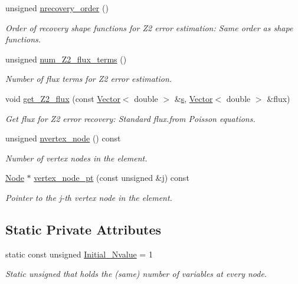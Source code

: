 \begin{DoxyCompactItemize}
unsigned \hyperlink{classoomph_1_1TPoissonElement_af9b5501d7aba59f31b9030e57d997af9}{nrecovery\+\_\+order} ()
\begin{DoxyCompactList}\small\item\em Order of recovery shape functions for Z2 error estimation\+: Same order as shape functions. \end{DoxyCompactList}\item 
unsigned \hyperlink{classoomph_1_1TPoissonElement_a73f3da4bd164baf56515f2244769a199}{num\+\_\+\+Z2\+\_\+flux\+\_\+terms} ()
\begin{DoxyCompactList}\small\item\em Number of \textquotesingle{}flux\textquotesingle{} terms for Z2 error estimation. \end{DoxyCompactList}\item 
void \hyperlink{classoomph_1_1TPoissonElement_adf66ac73ecb1a80c2c86ee01f26f52ae}{get\+\_\+\+Z2\+\_\+flux} (const \hyperlink{classoomph_1_1Vector}{Vector}$<$ double $>$ \&\hyperlink{cfortran_8h_ab7123126e4885ef647dd9c6e3807a21c}{s}, \hyperlink{classoomph_1_1Vector}{Vector}$<$ double $>$ \&flux)
\begin{DoxyCompactList}\small\item\em Get \textquotesingle{}flux\textquotesingle{} for Z2 error recovery\+: Standard flux.\+from Poisson equations. \end{DoxyCompactList}\item 
unsigned \hyperlink{classoomph_1_1TPoissonElement_a86423f2dcb0bf2a440036ad0128a8bc6}{nvertex\+\_\+node} () const
\begin{DoxyCompactList}\small\item\em Number of vertex nodes in the element. \end{DoxyCompactList}\item 
\hyperlink{classoomph_1_1Node}{Node} $\ast$ \hyperlink{classoomph_1_1TPoissonElement_abe160776ed0c3a2281a3b75ef8ef3ef3}{vertex\+\_\+node\+\_\+pt} (const unsigned \&j) const
\begin{DoxyCompactList}\small\item\em Pointer to the j-\/th vertex node in the element. \end{DoxyCompactList}\end{DoxyCompactItemize}
\subsection*{Static Private Attributes}
\begin{DoxyCompactItemize}
\item 
static const unsigned \hyperlink{classoomph_1_1TPoissonElement_ae2cd9ed9da1a72cd8b172884dae47d6d}{Initial\+\_\+\+Nvalue} = 1
\begin{DoxyCompactList}\small\item\em Static unsigned that holds the (same) number of variables at every node. \end{DoxyCompactList}\end{DoxyCompactItemize}
